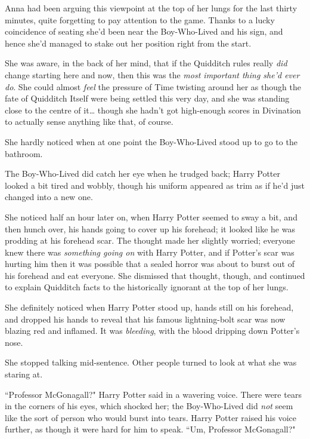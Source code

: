 Anna had been arguing this viewpoint at the top of her lungs for the last thirty minutes, quite forgetting to pay attention to the game. Thanks to a lucky coincidence of seating she'd been near the Boy-Who-Lived and his sign, and hence she'd managed to stake out her position right from the start.

She was aware, in the back of her mind, that if the Quidditch rules really \emph{did} change starting here and now, then this was the \emph{most important thing she'd ever do}. She could almost \emph{feel} the pressure of Time twisting around her as though the fate of Quidditch Itself were being settled this very day, and she was standing close to the centre of it{\ldots} though she hadn't got high-enough scores in Divination to actually sense anything like that, of course.

She hardly noticed when at one point the Boy-Who-Lived stood up to go to the bathroom.

The Boy-Who-Lived did catch her eye when he trudged back; Harry Potter looked a bit tired and wobbly, though his uniform appeared as trim as if he'd just changed into a new one.

She noticed half an hour later on, when Harry Potter seemed to sway a bit, and then hunch over, his hands going to cover up his forehead; it looked like he was prodding at his forehead scar. The thought made her slightly worried; everyone knew there was \emph{something going on} with Harry Potter, and if Potter's scar was hurting him then it was possible that a sealed horror was about to burst out of his forehead and eat everyone. She dismissed that thought, though, and continued to explain Quidditch facts to the historically ignorant at the top of her lungs.

She definitely noticed when Harry Potter stood up, hands still on his forehead, and dropped his hands to reveal that his famous lightning-bolt scar was now blazing red and inflamed. It was \emph{bleeding}, with the blood dripping down Potter's nose.

She stopped talking mid-sentence. Other people turned to look at what she was staring at.

``Professor McGonagall?" Harry Potter said in a wavering voice. There were tears in the corners of his eyes, which shocked her; the Boy-Who-Lived did \emph{not} seem like the sort of person who would burst into tears. Harry Potter raised his voice further, as though it were hard for him to speak. ``Um, Professor McGonagall?"

